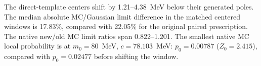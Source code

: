The direct-template centers shift by 1.21--4.38~MeV below their generated poles. The median absolute MC/Gaussian limit difference in the matched centered windows is 17.83\%, compared with 22.05\% for the original paired prescription. The native new/old MC limit ratios span 0.822--1.201. The smallest native MC local probability is at $m_0=80$~MeV, $c=78.103$~MeV: $p_0=0.00787$ ($Z_0=2.415$), compared with $p_0=0.02477$ before shifting the window.
